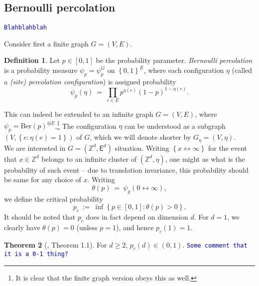 \documentclass[12pt]{article}
\newcommand{\E}{\mathsf{E}}
\newcommand{\Z}{\mathbb{Z}}
\newcommand{\set}[1]{\left\{#1\right\}}
\newcommand{\1}{\mathbbm{1}}
\newcommand{\5}{\vspace{0.5cm}}
\theoremstyle{definition}
\newtheorem{thm}{Theorem}[section]
\newtheorem{df}[thm]{Definition}
\begin{document}

\subsection{Bernoulli percolation}\label{app:3}

\textcolor{blue}{\texttt{Blahblahblah}} %

Consider first a finite graph $G=(V,E)$.
\begin{df}
Let $p\in[0,1]$ be the probability parameter. \textit{Bernoulli percolation} is a probability measure $\psi_p=\psi_p^G$ on $\set{0,1}^E$, where each configuration $\eta$ (called a \textit{(site) percolation configuration}) is assigned probability
$$\psi_p(\eta) ~=~ \prod_{e\in E}p^{\eta(e)}(1-p)^{1-\eta(e)}.$$
\end{df}
This can indeed be extended to an infinite graph $G=(V,E)$, where $\psi_p=\mathrm{Ber}(p)^{\otimes E}$.\footnote{It is clear that the finite graph version obeys this as well.} The configuration $\eta$ can be understood as a subgraph $(V,\set{e:\eta(e)=1})$ of $G$, which we will denote shorter by $G_\eta=(V,\eta)$.\\

We are interested in $G=(\Z^d,\E^d)$ situation. Writing $\set{x\leftrightarrow\infty}$ for the event that $x\in\Z^d$ belongs to an infinite cluster of $(\Z^d,\eta)$, one might as  what is the probability of such event -- due to translation invariance, this probability should be same for any choice of $x$. Writing
$$\theta(p) ~=~ \psi_p(0\leftrightarrow\infty),$$
we define the critical probability
$$p_c ~:=~ \inf\set{p\in[0,1]:\theta(p)>0}.$$
It should be noted that $p_c$ does in fact depend on dimension $d$. For $d=1$, we clearly have $\theta(p)=0$ (unless $p=1$), and hence $p_c(1)=1$. 

\begin{thm}[\cite{D-C}, Theorem 1.1]
For $d\geq 2$, $p_c(d)\in (0,1)$. \textcolor{blue}{\texttt{Some comment that it is a 0-1 thing?}}
\end{thm} 


\pagebreak

\end{document}
